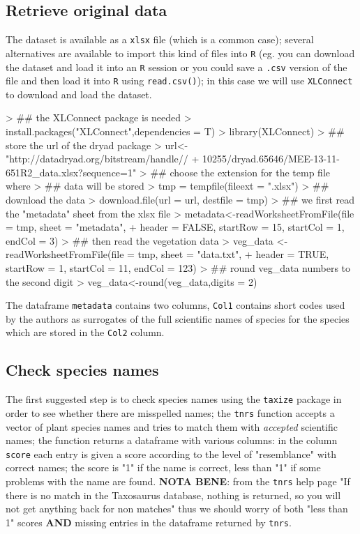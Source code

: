 \documentclass{article}
\begin{document}
 
\subsection{Retrieve original data}

   The dataset is available as a \texttt{xlsx} file (which is a common
   case); several alternatives are available to import this kind of files into \texttt{R} (eg. you can download the
   dataset and load it into an \texttt{R} session or you could save
   a \texttt{.csv} version of the file and then load it into
   \texttt{R} using \texttt{read.csv()}); in this case we will use
   \texttt{XLConnect} to download and load the dataset.

\begin{Schunk}
\begin{Sinput}
> ## the XLConnect package is needed
> install.packages("XLConnect",dependencies = T)
> library(XLConnect)
> ## store the  url of the dryad package
> url<-"http://datadryad.org/bitstream/handle//
+     10255/dryad.65646/MEE-13-11-651R2_data.xlsx?sequence=1"
> ## choose the extension for the temp file where 
> ## data will be stored
> tmp = tempfile(fileext = ".xlsx")
> ## download the data
> download.file(url = url, destfile = tmp)
> ## we first read the "metadata" sheet from the xlsx file
> metadata<-readWorksheetFromFile(file = tmp, sheet = "metadata", 
+  header = FALSE, startRow = 15, startCol = 1, endCol = 3)
> ## then read the vegetation data
> veg_data <-readWorksheetFromFile(file = tmp, sheet = "data.txt", 
+        header = TRUE, startRow = 1, startCol = 11, endCol = 123)
> ## round veg_data numbers to the second digit
> veg_data<-round(veg_data,digits = 2)
\end{Sinput}
\end{Schunk}
 
  The dataframe \texttt{metadata} contains two columns, \texttt{Col1}
  contains short codes used by the authors as surrogates of the full
  scientific names of species  for the species which are stored in the
  \texttt{Col2} column.

\subsection{Check species names}

  The first suggested step is to check species names using the
  \texttt{taxize} package in order to see whether there are
  misspelled names; the \texttt{tnrs} function accepts a vector of
  plant species names and tries to match them with \textit{accepted}
  scientific names; the function
  returns a dataframe with various columns: in the column
  \texttt{score} each entry is given a score according to the level of
  "resemblance" with correct names; the score is "1" if the name is
  correct, less than "1" if some problems with the name are
  found. \textbf{NOTA BENE}: from the \texttt{tnrs} help page "If there
  is no match in the Taxosaurus database, nothing is returned, so you
  will not get anything back for non matches" thus we should worry of
  both "less than 1" scores \textbf{AND} missing entries in the
  dataframe returned by \texttt{tnrs}.
  
\end{document}
